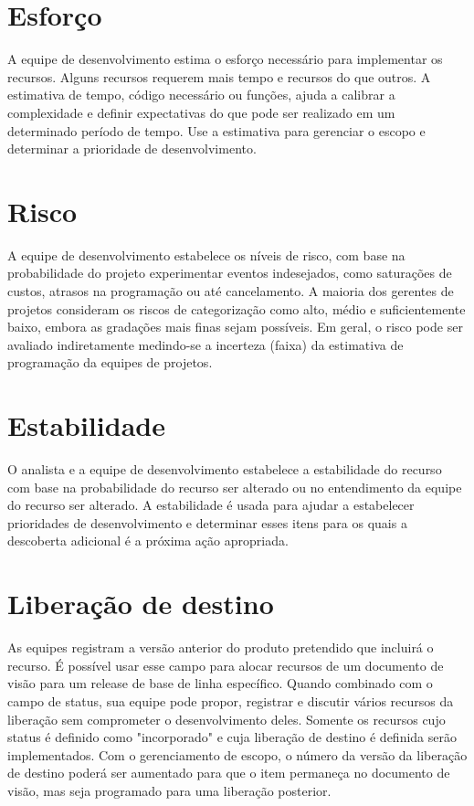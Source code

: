 \documentclass{report}
\begin{document}
\section{Esforço}

A equipe de desenvolvimento estima o esforço necessário para implementar os recursos. Alguns recursos requerem mais tempo e recursos do que outros. A estimativa de tempo, código necessário ou funções, ajuda a calibrar a complexidade e definir expectativas do que pode ser realizado em um determinado período de tempo. Use a estimativa para gerenciar o escopo e determinar a prioridade de desenvolvimento.

\section{Risco}

A equipe de desenvolvimento estabelece os níveis de risco, com base na probabilidade do projeto experimentar eventos indesejados, como saturações de custos, atrasos na programação ou até cancelamento. A maioria dos gerentes de projetos consideram os riscos de categorização como alto, médio e suficientemente baixo, embora as gradações mais finas sejam possíveis. Em geral, o risco pode ser avaliado indiretamente medindo-se a incerteza (faixa) da estimativa de programação da equipes de projetos.

\section{Estabilidade}

O analista e a equipe de desenvolvimento estabelece a estabilidade do recurso com base na probabilidade do recurso ser alterado ou no entendimento da equipe do recurso ser alterado. A estabilidade é usada para ajudar a estabelecer prioridades de desenvolvimento e determinar esses itens para os quais a descoberta adicional é a próxima ação apropriada.

\section{Liberação de destino}

As equipes registram a versão anterior do produto pretendido que incluirá o recurso. É possível usar esse campo para alocar recursos de um documento de visão para um release de base de linha específico. Quando combinado com o campo de status, sua equipe pode propor, registrar e discutir vários recursos da liberação sem comprometer o desenvolvimento deles. Somente os recursos cujo status é definido como "incorporado" e cuja liberação de destino é definida serão implementados. Com o gerenciamento de escopo, o número da versão da liberação de destino poderá ser aumentado para que o item permaneça no documento de visão, mas seja programado para uma liberação posterior.
\end{document}
